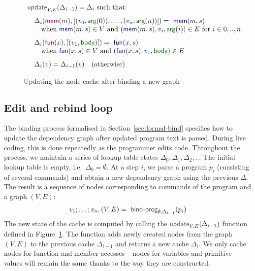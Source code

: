 \documentclass[acmsmall,anonymous,fleqn]{acmart}\settopmatter{printfolios=false,printccs=false,printacmref=false}
\theoremstyle{plain}
\theoremstyle{definition}
\newcommand{\ident}[1]{\textnormal{\textcolor{idclr}{\sffamily #1}}}
\newcommand{\bndclr}[1]{\textcolor{kvdclr}{#1}}
\newcommand{\bkndclr}[1]{\textcolor{prepclr}{#1}}
\newcommand{\bnd}[1]{\textnormal{\textcolor{kvdclr}{\sffamily #1}}}
\newcommand{\bknd}[1]{\textnormal{\textcolor{prepclr}{\sffamily #1}}}
\newcommand{\blbl}[1]{\textnormal{\textcolor{numclr}{\sffamily #1}}}
\begin{document}

\begin{figure}
\begin{equation*}
\begin{array}{l}
\ident{update}_{V,E}(\Delta_{i-1}) = \Delta_i~\textnormal{such that:}
\\[0.75em]
\quad\Delta_{i}(\bknd{mem}(m), [(\bndclr{v_0},\blbl{arg}(0)),\ldots, (\bndclr{v_n},\blbl{arg}(n))]) = \bnd{mem}(m, s)\\
\quad\quad \textnormal{when}~\bnd{mem}(m, s) \in V
~\textnormal{and}~(\bnd{mem}(m, s), \bndclr{v_i}, \blbl{arg}(i)) \in E~\textnormal{for}~i\in 0,..,n
\\[0.75em]
\quad\Delta_{i}(\bknd{fun}(x), [(\bndclr{v_1},\blbl{body})]) = \bnd{fun}(x, s)\\
\quad\quad \textnormal{when}~\bnd{fun}(x, s) \in V
~\textnormal{and}~(\bnd{fun}(x, s), \bndclr{v_1}, \blbl{body}) \in E
\\[0.75em]
\quad\Delta_{i}(\bkndclr{v}) = \Delta_{i-1}(\bkndclr{v})\quad \textnormal{(otherwise)}
\end{array}
\end{equation*}
\vspace{-1em}
\caption{Updating the node cache after binding a new graph}
\label{fig:loop}
\vspace{-0.5em}
\end{figure}


\subsection{Edit and rebind loop}

The binding process formalised in Section~\ref{sec:formal-bind} specifies how to update the
dependency graph after updated program text is parsed. During live coding, this is done
repeatedly as the programmer edits code. Throughout the process, we maintain a series of
lookup table states $\Delta_0, \Delta_1, \Delta_2, \ldots$ The initial lookup table is
empty, i.e.~$\Delta_0 = \emptyset$. At a step $i$, we parse a program $p_i$ (consisting of
several commands) and obtain a new dependency graph using the previous $\Delta$. The result is
a sequence of nodes corresponding to commands of the program and a graph $(V, E)$:
%
\begin{equation*}
\bndclr{v_1}; \ldots; \bndclr{v_n}, (V, E) = \ident{bind-prog}_{\emptyset, \Delta_{i-1}}(p_i)
\end{equation*}
%
The new state of the cache is computed by calling the $\ident{update}_{V, E}(\Delta_{i-1})$ function
defined in Figure~\ref{fig:loop}. The function adds newly created nodes from the graph
$(V, E)$ to the previous cache $\Delta_{i-1}$ and returns a new cache $\Delta_{i}$. We only cache
nodes for function and member accesses -- nodes for variables and primitive values will remain
the same thanks to the way they are constructed.
\end{document}
